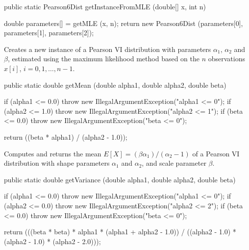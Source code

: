 \begin{code}

   public static Pearson6Dist getInstanceFromMLE (double[] x, int n)\begin{hide} {
      double parameters[] = getMLE (x, n);
      return new Pearson6Dist (parameters[0], parameters[1], parameters[2]);
   }\end{hide}
\end{code}
\begin{tabb}
   Creates a new instance of a Pearson VI distribution with parameters $\alpha_1$,
   $\alpha_2$ and $\beta$, estimated using the maximum likelihood method based on
   the $n$ observations $x[i]$, $i = 0, 1, \ldots, n-1$.
\end{tabb}
\begin{htmlonly}
\end{htmlonly}
\begin{code}

   public static double getMean (double alpha1, double alpha2,
                                 double beta)\begin{hide} {
      if (alpha1 <= 0.0)
         throw new IllegalArgumentException("alpha1 <= 0");
      if (alpha2 <= 1.0)
         throw new IllegalArgumentException("alpha2 <= 1");
      if (beta <= 0.0)
         throw new IllegalArgumentException("beta <= 0");

      return ((beta * alpha1) / (alpha2 - 1.0));
   }\end{hide}
\end{code}
\begin{tabb}
   Computes and returns the mean $E[X] = (\beta \alpha_1) / (\alpha_2 - 1)$ of a
   Pearson VI distribution with shape parameters $\alpha_1$ and $\alpha_2$, and
   scale parameter $\beta$.
\end{tabb}
\begin{code}

   public static double getVariance (double alpha1, double alpha2,
                                     double beta)\begin{hide} {
      if (alpha1 <= 0.0)
         throw new IllegalArgumentException("alpha1 <= 0");
      if (alpha2 <= 0.0)
         throw new IllegalArgumentException("alpha2 <= 2");
      if (beta <= 0.0)
         throw new IllegalArgumentException("beta <= 0");

      return (((beta * beta) * alpha1 * (alpha1 + alpha2 - 1.0)) /
((alpha2 - 1.0) * (alpha2 - 1.0) * (alpha2 - 2.0)));
   }\end{hide}
\end{code}

